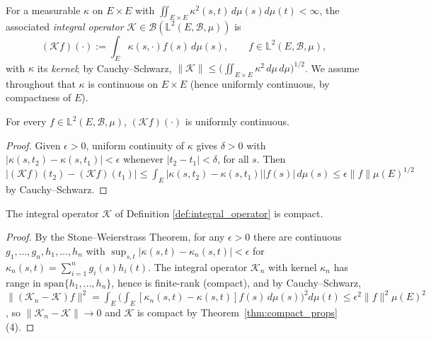\begin{definition}
\label{def:integral_operator}
For a measurable $\kappa$ on $E\times E$ with $\iint_{E\times E}\kappa^2(s,
t)\,d\mu(s)d\mu(t)<\infty$, the associated \emph{integral operator}
$\mathcal{K}\in\mathcal{B}(\mathbb{L}^2(E,\mathcal{B},\mu))$ is
\begin{equation}
(\mathcal{K}f)(\cdot) := \int_E \kappa(s,\cdot)f(s)\,d\mu(s), \qquad
f\in\mathbb{L}^2(E,\mathcal{B},\mu),
\label{eq:integral_operator}
\end{equation}
with $\kappa$ its \emph{kernel}; by Cauchy--Schwarz,
$\|\mathcal{K}\|\leq\big(\iint_{E\times E}\kappa^2\,d\mu\,d\mu\big)^{1/2}$.
We assume throughout that $\kappa$ is continuous on $E\times E$ (hence
uniformly continuous, by compactness of $E$).
\end{definition}

\begin{lemma}
\label{lem:kf_continuous}
For every $f\in\mathbb{L}^2(E,\mathcal{B},\mu)$, $(\mathcal{K}f)(\cdot)$ is
uniformly continuous.
\end{lemma}

\begin{proof}
Given $\epsilon>0$, uniform continuity of $\kappa$ gives $\delta>0$ with
$|\kappa(s,t_2)-\kappa(s,t_1)|<\epsilon$ whenever $|t_2-t_1|<\delta$, for
all $s$. Then $|(\mathcal{K}f)(t_2)-(\mathcal{K}f)(t_1)|\leq\int_E|\kappa(s,
t_2)-\kappa(s,t_1)||f(s)|\,d\mu(s)\leq\epsilon\|f\|\mu(E)^{1/2}$ by
Cauchy--Schwarz.
\end{proof}

\begin{theorem}
\label{thm:integral_operator_compact}
The integral operator $\mathcal{K}$ of Definition
\ref{def:integral_operator} is compact.
\end{theorem}

\begin{proof}
By the Stone--Weierstrass Theorem, for any $\epsilon>0$ there are
continuous $g_1,\dots,g_n,h_1,\dots,h_n$ with $\sup_{s,t}|\kappa(s,t)-
\kappa_n(s,t)|<\epsilon$ for $\kappa_n(s,t)=\sum_{i=1}^ng_i(s)h_i(t)$. The
integral operator $\mathcal{K}_n$ with kernel $\kappa_n$ has range in
$\mathrm{span}\{h_1,\dots,h_n\}$, hence is finite-rank (compact), and by
Cauchy--Schwarz, $\|(\mathcal{K}_n-\mathcal{K})f\|^2 = \int_E\big(\int_E
[\kappa_n(s,t)-\kappa(s,t)]f(s)\,d\mu(s)\big)^2d\mu(t) \leq
\epsilon^2\|f\|^2\mu(E)^2$, so $\|\mathcal{K}_n-\mathcal{K}\|\to 0$ and
$\mathcal{K}$ is compact by Theorem~\ref{thm:compact_props}(4).
\end{proof}

